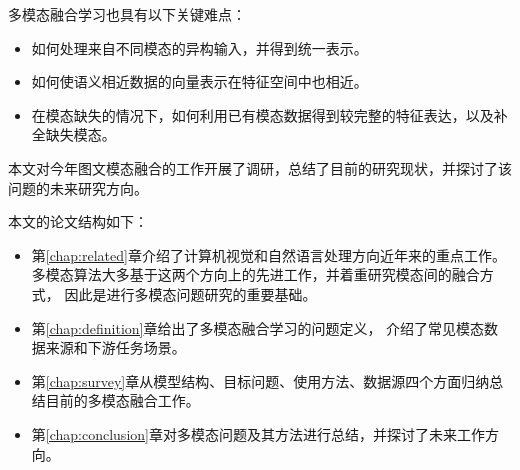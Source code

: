 多模态融合学习也具有以下关键难点：

\begin{itemize}
    \item 如何处理来自不同模态的异构输入，并得到统一表示。
    \item 如何使语义相近数据的向量表示在特征空间中也相近。
    \item 在模态缺失的情况下，如何利用已有模态数据得到较完整的特征表达，以及补全缺失模态。
\end{itemize}

本文对今年图文模态融合的工作开展了调研，总结了目前的研究现状，并探讨了该问题的未来研究方向。

本文的论文结构如下：

\begin{itemize}
    \item 第\ref{chap:related}章介绍了计算机视觉和自然语言处理方向近年来的重点工作。
    多模态算法大多基于这两个方向上的先进工作，并着重研究模态间的融合方式，
    因此是进行多模态问题研究的重要基础。
    \item 第\ref{chap:definition}章给出了多模态融合学习的问题定义，
    介绍了常见模态数据来源和下游任务场景。
    \item 第\ref{chap:survey}章从模型结构、目标问题、使用方法、数据源四个方面归纳总结目前的多模态融合工作。
    \item 第\ref{chap:conclusion}章对多模态问题及其方法进行总结，并探讨了未来工作方向。
\end{itemize}

\begin{comment}

\section{研究内容与技术路线}

\subsection{信号灯控制问题概述}

\end{comment}
